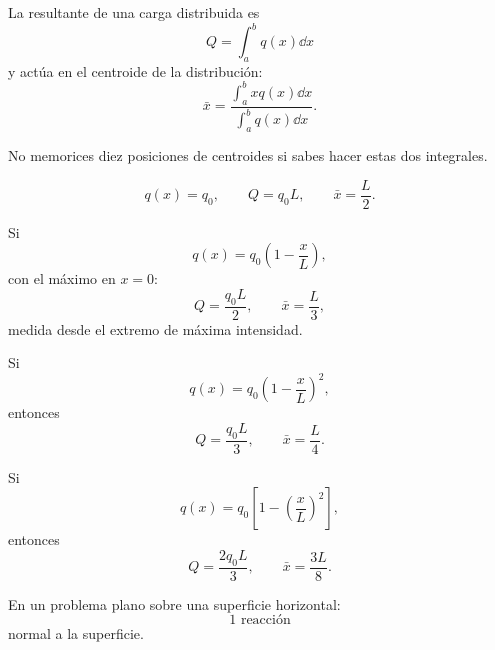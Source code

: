 La resultante de una carga distribuida es
\[
Q=\int_a^b q(x)\dd x
\]
y actúa en el centroide de la distribución:
\[
\bar x=
\frac{\displaystyle\int_a^b xq(x)\dd x}
{\displaystyle\int_a^b q(x)\dd x}.
\]

\begin{tip}
No memorices diez posiciones de centroides si sabes hacer estas dos integrales.
\end{tip}


\[
q(x)=q_0,
\qquad
Q=q_0L,
\qquad
\bar x=\frac{L}{2}.
\]

Si
\[
q(x)=q_0\left(1-\frac{x}{L}\right),
\]
con el máximo en $x=0$:
\[
Q=\frac{q_0L}{2},
\qquad
\bar x=\frac{L}{3},
\]
medida desde el extremo de máxima intensidad.

Si
\[
q(x)=q_0\left(1-\frac{x}{L}\right)^2,
\]
entonces
\[
Q=\frac{q_0L}{3},
\qquad
\bar x=\frac{L}{4}.
\]

Si
\[
q(x)=q_0\left[1-\left(\frac{x}{L}\right)^2\right],
\]
entonces
\[
Q=\frac{2q_0L}{3},
\qquad
\bar x=\frac{3L}{8}.
\]


En un problema plano sobre una superficie horizontal:
\[
\text{1 reacción}
\]
normal a la superficie.
